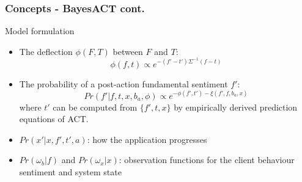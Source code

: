 \documentclass{beamer}
\begin{document}
\begin{frame}
\frametitle{Concepts - BayesACT cont.}
Model formulation
\begin{itemize}
\pause \item The deflection $\phi(F, T)$ between $F$ and $T$: 
\begin{equation}\label{eq:eq_deflection}
\phi(f,t) \propto e^{-(f'-t')\Sigma^{-1}(f-t)}
\end{equation}
\pause \item The probability of a post-action fundamental sentiment $f'$:
\begin{equation}\label{eq:eq_pr_f}
Pr(f'|f,t,x,b_{a},\phi) \propto e^{-\phi(f',t')-\xi(f',f,b_{a},x)} 
\end{equation}
where $t'$ can be computed from $\{f', t, x\}$ by empirically derived prediction equations of ACT.
\pause \item $Pr(x'|x,f',t',a)$: how the application progresses
\pause \item $Pr(\omega_{b}|f)$ and $Pr(\omega_{x}|x)$: observation functions for the client behaviour sentiment and system state 
\end{itemize}
\end{frame}

\end{document}
